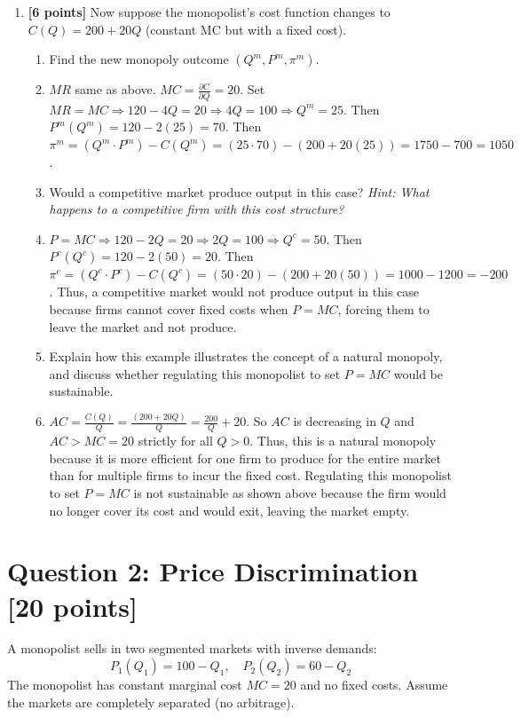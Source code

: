 \documentclass[11pt]{article}
\begin{document}
\begin{enumerate}[label=(\alph*)]
    \item \textbf{[6 points]} Now suppose the monopolist's cost function changes to $C(Q) = 200 + 20Q$ (constant MC but with a fixed cost).
    \begin{enumerate}[label=(\roman*)]
        \item Find the new monopoly outcome $(Q^m, P^m, \pi^m)$.
        \item[] $MR$ same as above. $MC=\frac{\partial C}{\partial Q}=20$. Set $MR=MC\Rightarrow 120-4Q=20\Rightarrow 4Q=100\Rightarrow Q^m=25$. Then $P^m(Q^m)=120-2(25)=70$. Then $\pi^m=(Q^m\cdot P^m)-C(Q^m)=(25\cdot 70)-(200+20(25))=1750-700=1050$.
        \item Would a competitive market produce output in this case? \textit{Hint: What happens to a competitive firm with this cost structure?}
        \item[] $P=MC\Rightarrow 120-2Q=20\Rightarrow2Q=100\Rightarrow Q^c=50$. Then $P^c(Q^c)=120-2(50)=20$. Then $\pi^c=(Q^c\cdot P^c)-C(Q^c)=(50\cdot 20)-(200+20(50))=1000-1200=-200$. Thus, a competitive market would not produce output in this case because firms cannot cover fixed costs when $P=MC$, forcing them to leave the market and not produce.
        \item Explain how this example illustrates the concept of a natural monopoly, and discuss whether regulating this monopolist to set $P = MC$ would be sustainable.
        \item[] $AC=\frac{C(Q)}{Q}=\frac{(200+20Q)}{Q}=\frac{200}{Q}+20$. So $AC$ is decreasing in $Q$ and $AC>MC=20$ strictly for all $Q>0$. Thus, this is a natural monopoly because it is more efficient for one firm to produce for the entire market than for multiple firms to incur the fixed cost. Regulating this monopolist to set $P=MC$ is not sustainable as shown above because the firm would no longer cover its cost and would exit, leaving the market empty.
    \end{enumerate}
\end{enumerate}

\section*{Question 2: Price Discrimination [20 points]}

A monopolist sells in two segmented markets with inverse demands:
\[
P_1(Q_1) = 100 - Q_1, \quad P_2(Q_2) = 60 - Q_2
\]
The monopolist has constant marginal cost $MC = 20$ and no fixed costs. Assume the markets are completely separated (no arbitrage).
\end{document}
